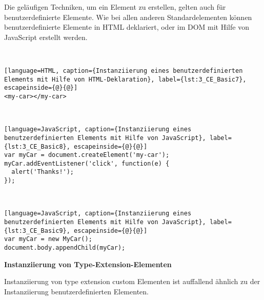 Die geläufigen Techniken, um ein Element zu erstellen, gelten auch für benutzerdefinierte Elemente. Wie bei allen anderen Standardelementen können benutzerdefinierte Elemente in HTML deklariert, oder im DOM mit Hilfe von JavaScript erstellt werden.

\begin{enumerate}
 \hfill \\
\begin{lstlisting}[language=HTML, caption={Instanziierung eines benutzerdefinierten Elements mit Hilfe von HTML-Deklaration}, label={lst:3_CE_Basic7}, escapeinside={@}{@}]
<my-car></my-car>
\end{lstlisting}

 \hfill \\
\begin{lstlisting}[language=JavaScript, caption={Instanziierung eines benutzerdefinierten Elements mit Hilfe von JavaScript}, label={lst:3_CE_Basic8}, escapeinside={@}{@}]
var myCar = document.createElement('my-car');
myCar.addEventListener('click', function(e) {
  alert('Thanks!');
});
\end{lstlisting}

 \hfill \\
\begin{lstlisting}[language=JavaScript, caption={Instanziierung eines benutzerdefinierten Elements mit Hilfe von JavaScript}, label={lst:3_CE_Basic9}, escapeinside={@}{@}]
var myCar = new MyCar();
document.body.appendChild(myCar);
\end{lstlisting}
\end{enumerate}

\textbf{Instanziierung von Type-Extension-Elementen}

Instanziierung von type extension custom Elementen ist auffallend ähnlich zu der Instanziierung benutzerdefinierten Elementen.

